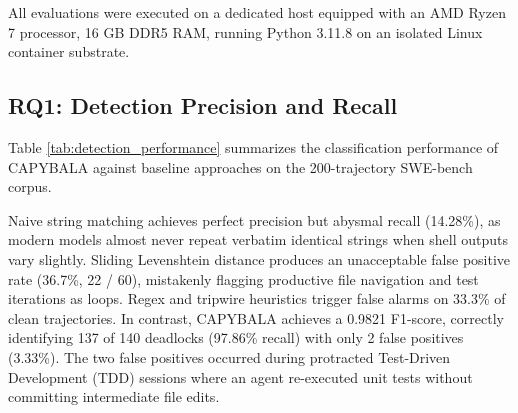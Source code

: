 \documentclass[journal]{IEEEtran}
\begin{document}
All evaluations were executed on a dedicated host equipped with an AMD Ryzen 7 processor, 16 GB DDR5 RAM, running Python 3.11.8 on an isolated Linux container substrate.

\subsection{RQ1: Detection Precision and Recall}

Table \ref{tab:detection_performance} summarizes the classification performance of CAPYBALA against baseline approaches on the 200-trajectory SWE-bench corpus.

\begin{table}[!t]
\caption{Classification Performance on SWE-bench Trajectories}
\label{tab:detection_performance}
\centering
{}
\end{table}

Naive string matching achieves perfect precision but abysmal recall (14.28\%), as modern models almost never repeat verbatim identical strings when shell outputs vary slightly. Sliding Levenshtein distance produces an unacceptable false positive rate (36.7\%, 22 / 60), mistakenly flagging productive file navigation and test iterations as loops. Regex and tripwire heuristics trigger false alarms on 33.3\% of clean trajectories. In contrast, CAPYBALA achieves a 0.9821 F1-score, correctly identifying 137 of 140 deadlocks (97.86\% recall) with only 2 false positives (3.33\%). The two false positives occurred during protracted Test-Driven Development (TDD) sessions where an agent re-executed unit tests without committing intermediate file edits.
\end{document}
